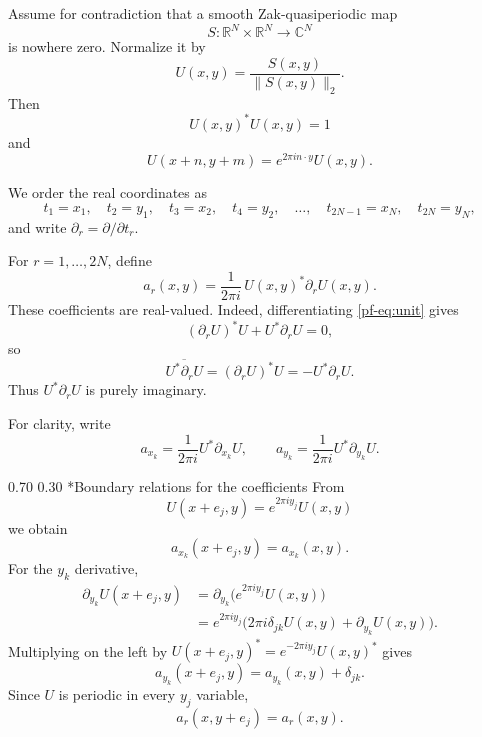 \documentclass[11pt,reqno]{amsart}
\makeatletter
\numberwithin{equation}{section}
\renewcommand\subsubsection{\@startsection{subsubsection}{3}{\z@}%
  {0.70\baselineskip \@plus 0.20\baselineskip \@minus 0.10\baselineskip}%
  {0.30\baselineskip}%
  {\normalfont\bfseries}}
\theoremstyle{definition}
\theoremstyle{remark}
\newcommand{\R}{\mathbb R}
\newcommand{\C}{\mathbb C}
\newcommand{\norm}[1]{\lVert #1\rVert}
\makeatother
\begin{document}
Assume for contradiction that a smooth Zak-quasiperiodic map
\[
 S:\R^N\times\R^N\longrightarrow\C^N
\]
is nowhere zero.  Normalize it by
\begin{equation}\label{pf-eq:normalize}
 U(x,y)=\frac{S(x,y)}{\norm{S(x,y)}_2}.
\end{equation}
Then
\begin{equation}\label{pf-eq:unit}
 U(x,y)^*U(x,y)=1
\end{equation}
and
\begin{equation}\label{pf-eq:U-boundary}
 U(x+n,y+m)=e^{2\pi i n\cdot y}U(x,y).
\end{equation}

We order the real coordinates as
\begin{equation}\label{pf-eq:coordinate-order}
 t_1=x_1,\quad t_2=y_1,\quad t_3=x_2,\quad t_4=y_2,
 \quad\ldots,\quad t_{2N-1}=x_N,\quad t_{2N}=y_N,
\end{equation}
and write $\partial_r=\partial/\partial t_r$.

For $r=1,\ldots,2N$, define
\begin{equation}\label{pf-eq:a-r}
 a_r(x,y)=\frac{1}{2\pi i}\,U(x,y)^*\partial_rU(x,y).
\end{equation}
These coefficients are real-valued.  Indeed, differentiating
\eqref{pf-eq:unit} gives
\[
 (\partial_rU)^*U+U^*\partial_rU=0,
\]
so
\[
 \overline{U^*\partial_rU}
 = (\partial_rU)^*U
 =-U^*\partial_rU.
\]
Thus $U^*\partial_rU$ is purely imaginary.

For clarity, write
\[
 a_{x_k}=\frac{1}{2\pi i}U^*\partial_{x_k}U,
 \qquad
 a_{y_k}=\frac{1}{2\pi i}U^*\partial_{y_k}U.
\]

\subsubsection*{Boundary relations for the coefficients}
From
\[
 U(x+e_j,y)=e^{2\pi i y_j}U(x,y)
\]
we obtain
\begin{equation}\label{pf-eq:ax-boundary}
 a_{x_k}(x+e_j,y)=a_{x_k}(x,y).
\end{equation}
For the $y_k$ derivative,
\begin{align*}
 \partial_{y_k}U(x+e_j,y)
 &=\partial_{y_k}\bigl(e^{2\pi i y_j}U(x,y)\bigr)\\
 &=e^{2\pi i y_j}
 \bigl(2\pi i\delta_{jk}U(x,y)+\partial_{y_k}U(x,y)\bigr).
\end{align*}
Multiplying on the left by $U(x+e_j,y)^*=e^{-2\pi i y_j}U(x,y)^*$ gives
\begin{equation}\label{pf-eq:ay-boundary}
 a_{y_k}(x+e_j,y)=a_{y_k}(x,y)+\delta_{jk}.
\end{equation}
Since $U$ is periodic in every $y_j$ variable,
\begin{equation}\label{pf-eq:y-periodicity-a}
 a_r(x,y+e_j)=a_r(x,y).
\end{equation}
\end{document}
